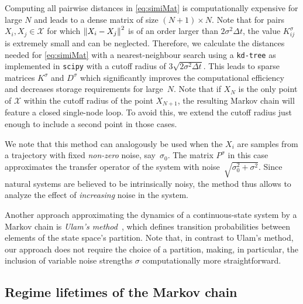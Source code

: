 Computing all pairwise distances in \cref{eq:simiMat} is computationally expensive for large $N$ and leads to a dense matrix of size $(N+1)\times N$. Note that for pairs $X_i, X_j \in \mathcal{X}$ for which $\left\lVert X_i - X_j\right\rVert^2$ is of an order larger than $2\sigma^2 \Delta t$, the value $K_{ij}^\sigma$ is extremely small and can be neglected. Therefore, we calculate the distances needed for \cref{eq:simiMat} with a nearest-neighbour search using a \texttt{kd-tree} as implemented in \texttt{scipy} \parencite{virtanenSciPyFundamentalAlgorithms2020} with a cutoff radius of $3\sqrt{2\sigma^2 \Delta t}$. This leads to sparse matrices $K^\sigma$ and $D^\sigma$ which significantly improves the computational efficiency and decreases storage requirements for large~$N$. %
Note that if $X_N$ is the only point of $\mathcal{X}$ within the cutoff radius of the point $X_{N+1}$, the resulting Markov chain will feature a closed single-node loop. To avoid this, we extend the cutoff radius just enough to include a second point in those cases.

\begin{remark}
    \label{rem:noisy_basetraj}
    We note that this method can analogously be used when the $X_i$ are samples from a trajectory with fixed \emph{non-zero} noise, say~$\sigma_0$. The matrix $P^{\sigma}$ in this case approximates the transfer operator of the system with noise~$\sqrt{\sigma_0^2 + \sigma^2}$. Since natural systems are believed to be intrinsically noisy, the method thus allows to analyze the effect of \emph{increasing} noise in the system.
\end{remark}

\begin{remark}
    Another approach approximating the dynamics of a continuous-state system by a Markov chain is \emph{Ulam's method}~\parencite{ulamCollectionMathematicalProblems1960}, which defines transition probabilities between elements of the state space's partition.
    Note that, in contrast to Ulam's method, our approach does not require the choice of a partition, making, in particular, the inclusion of variable noise strengths $\sigma$ computationally more straightforward.
\end{remark}

\subsection{Regime lifetimes of the Markov chain}

